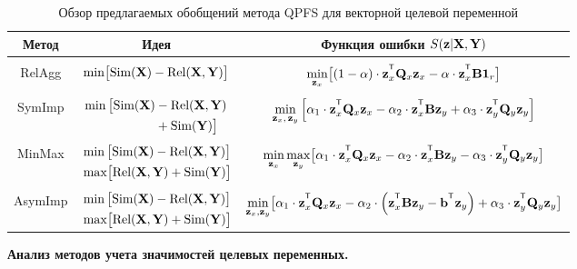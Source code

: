 \documentclass[11pt, a5paper]{dissert}
\begin{document}
\begin{table}[ht]
	\centering
	\caption{Обзор предлагаемых обобщений метода QPFS для векторной целевой переменной}
	\small{
		\begin{tabular}{c|c|c}
			\hline
			Метод & Идея & Функция ошибки $S(\mathbf{z} | \mathbf{X}, \mathbf{Y})$ \\
			\hline && \\ [-.5em]
			RelAgg & $\min \bigl[ \text{Sim}(\mathbf{X}) - \text{Rel}(\mathbf{X}, \mathbf{Y}) \bigr] $ & $\min\limits_{\bz_x} \bigl[ (1 - \alpha) \cdot \bz_x^{\T} \bQ_x \bz_x - \alpha \cdot \bz_x^{\T} \bB \bOne_r \bigr] $ \\ &&\\[-.5em]
			SymImp & $\begin{aligned} \min \, \bigl[ \text{Sim}(\mathbf{X}) & - \text{Rel}(\mathbf{X}, \mathbf{Y}) \\ & + \text{Sim}(\mathbf{Y}) \bigr] \end{aligned}$ & $ \min\limits_{\bz_x, \, \bz_y} \left[ \alpha_1 \cdot \bz_x^{\T} \bQ_x \bz_x - \alpha_2 \cdot \bz_x^{\T} \bB \bz_y + \alpha_3 \cdot \bz_y^{\T} \bQ_y \bz_y \right] $\\ &&\\ [-.5em]
			MinMax & $\begin{aligned} &\min \, \bigl[ \text{Sim}(\mathbf{X}) - \text{Rel}(\mathbf{X}, \mathbf{Y}) \bigr]  \\ & \max \bigl[\text{Rel}(\mathbf{X}, \mathbf{Y}) + \text{Sim}(\mathbf{Y}) \bigr] \end{aligned}$ & $	\min\limits_{\bz_x} 	\max\limits_{\bz_y} \bigl[\alpha_1 \cdot \bz_x^{\T} \bQ_x \bz_x - \alpha_2 \cdot \bz_x^{\T} \bB \bz_y - \alpha_3 \cdot \bz_y^{\T} \bQ_y \bz_y \bigr]$ \\ &&\\ [-.5em]
			AsymImp & $\begin{aligned} & \min \, \bigl[ \text{Sim}(\mathbf{X}) - \text{Rel}(\mathbf{X}, \mathbf{Y}) \bigr]\\ &  \max \bigl[\text{Rel}(\mathbf{X}, \mathbf{Y}) + \text{Sim}(\mathbf{Y}) \bigr] \end{aligned}$ & $\min\limits_{\bz_x, \bz_y} \bigl[ \alpha_1 \cdot \bz_x^{\T} \bQ_x \bz_x - \alpha_2 \cdot \left(\bz_x^{\T} \bB \bz_y - \bb^{\T} \bz_y \right) + \alpha_3 \cdot \bz_y^{\T} \bQ_y \bz_y \bigr]$\\ 
			\hline
	\end{tabular}}
	\label{ch3:tbl:summary}
\end{table}


\textbf{Анализ методов учета значимостей целевых переменных.}
\label{sec:ch3:exp_mqpfs}
\end{document}
